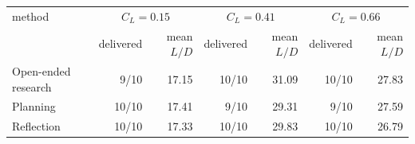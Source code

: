 \begin{tabular}{lrrrrrr}
\toprule
method & \multicolumn{2}{c}{$C_L=0.15$} & \multicolumn{2}{c}{$C_L=0.41$} & \multicolumn{2}{c}{$C_L=0.66$} \\
 & delivered & mean $L/D$ & delivered & mean $L/D$ & delivered & mean $L/D$ \\
\midrule
Open-ended research & 9/10 & 17.15 & 10/10 & 31.09 & 10/10 & 27.83 \\
Planning & 10/10 & 17.41 & 9/10 & 29.31 & 9/10 & 27.59 \\
Reflection & 10/10 & 17.33 & 10/10 & 29.83 & 10/10 & 26.79 \\
\bottomrule
\end{tabular}
